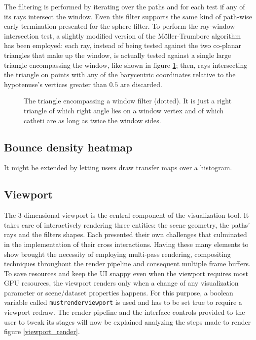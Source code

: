 The filtering is performed by iterating over the paths and for each test if any of its rays intersect the window. Even this filter supports the same kind of path-wise early termination presented for the sphere filter. To perform the ray-window intersection test, a slightly modified version of the M\"oller-Trumbore algorithm \cite{moller1997fast} has been employed: each ray, instead of being tested  against the two co-planar triangles that make up the window, is actually tested against a single large triangle encompassing the window, like shown in figure \ref{encompassing_triangle}; then, rays intersecting the triangle on points with any of the barycentric coordinates relative to the hypotenuse's vertices greater than $0.5$ are discarded.
\begin{figure}
	\centering

	\caption{The triangle encompassing a window filter (dotted). It is just a right triangle of which right angle lies on a window vertex and of which catheti are as long as twice the window sides.}
	\label{encompassing_triangle}
\end{figure}	


\subsection{Bounce density heatmap}
It might be extended by letting users draw transfer maps over a histogram.


\subsection{Viewport}
The 3-dimensional viewport is the central component of the visualization tool. It takes care of interactively rendering three entities: the scene geometry, the paths' rays and the filters shapes. Each presented their own challenges that culminated in the implementation of their cross interactions. Having these many elements to show brought the necessity of employing multi-pass rendering, compositing techniques throughout the render pipeline and consequent multiple frame buffers. To save resources and keep the UI snappy even when the viewport requires most GPU resources, the viewport renders only when a change of any visualization parameter or scene/dataset properties happens. For this purpose, a boolean variable called \texttt{mustrenderviewport} is used and has to be set true to require a viewport redraw. The render pipeline and the interface controls provided to the user to tweak its stages will now be explained analyzing the steps made to render figure \ref{viewport_render}.

